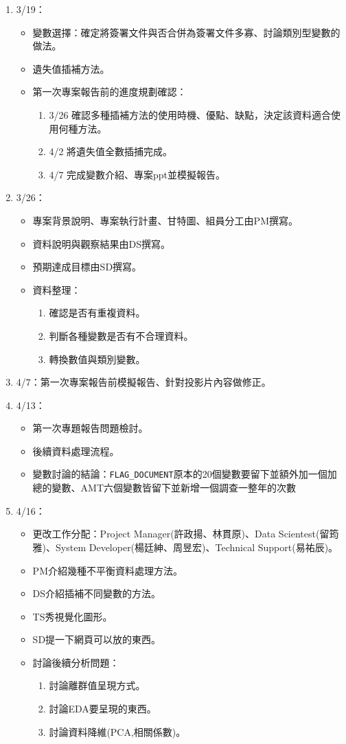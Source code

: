 \documentclass[12pt, a4paper]{article}
\begin{document}
\begin{itemize}
\begin{enumerate}
\item 3/19：
\begin{itemize}
\item 變數選擇：確定將簽署文件與否合併為簽署文件多寡、討論類別型變數的做法。
\item 遺失值插補方法。
\item 第一次專案報告前的進度規劃確認：
\begin{enumerate}
\item 3/26 確認多種插補方法的使用時機、優點、缺點，決定該資料適合使用何種方法。
\item 4/2 將遺失值全數插捕完成。
\item 4/7 完成變數介紹、專案ppt並模擬報告。
\end{enumerate}
\end{itemize}
\item 3/26：
\begin{itemize}
\item 專案背景說明、專案執行計畫、甘特圖、組員分工由PM撰寫。
\item 資料說明與觀察結果由DS撰寫。
\item 預期達成目標由SD撰寫。
\item 資料整理：
\begin{enumerate}
\item 確認是否有重複資料。
\item 判斷各種變數是否有不合理資料。
\item 轉換數值與類別變數。
\end{enumerate}
\end{itemize}
\item 4/7：第一次專案報告前模擬報告、針對投影片內容做修正。

\item 4/13：
\begin{itemize}
\item 第一次專題報告問題檢討。
\item 後續資料處理流程。
\item 變數討論的結論：\verb|FLAG_DOCUMENT|原本的20個變數要留下並額外加一個加總的變數、AMT六個變數皆留下並新增一個調查一整年的次數
\end{itemize}

\item 4/16：
\begin{itemize}
\item 更改工作分配：Project Manager(許政揚、林貫原)、Data Scientest(留筠雅)、System Developer(楊廷紳、周昱宏)、Technical Support(易祐辰)。
\item PM介紹幾種不平衡資料處理方法。
\item DS介紹插補不同變數的方法。
\item TS秀視覺化圖形。
\item SD提一下網頁可以放的東西。
\item 討論後續分析問題：
\begin{enumerate}
\item 討論離群值呈現方式。
\item 討論EDA要呈現的東西。
\item 討論資料降維(PCA,相關係數)。
\end{enumerate}
\end{itemize}



\end{enumerate}
\end{itemize}
\end{document}
